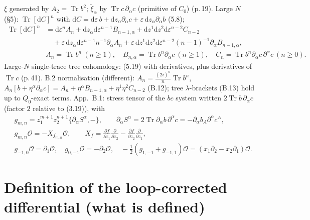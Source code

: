 \documentclass[11pt]{article}
\newcommand{\Tr}{\operatorname{Tr}}
\newcommand{\cO}{\mathcal{O}}
\begin{document}
$\xi$ generated by $A_2=\Tr b^2$; $\tilde\xi_\alpha$ by $\Tr c\,\partial_\alpha c$ (primitive of $C_0$) (p.\,19). Large $N$ (§5): $\Tr[\mathrm dC]^n$ with $\mathrm dC=\mathrm d\varepsilon\,b+\mathrm dz_\alpha\partial_\alpha c+\varepsilon\,\mathrm dz_\alpha\partial_\alpha b$ (5.8);
\begin{align}
\Tr[\mathrm dC]^n&=\mathrm d\varepsilon^nA_n+\mathrm dz_\alpha\mathrm d\varepsilon^{n-1}B_{n-1,\alpha}+\mathrm dz^1\mathrm dz^2\mathrm d\varepsilon^{n-2}C_{n-2}\nonumber\\
&\quad+\varepsilon\,\mathrm dz_\alpha\mathrm d\varepsilon^{n-1}n^{-1}\partial_\alpha A_n+\varepsilon\,\mathrm dz^1\mathrm dz^2\mathrm d\varepsilon^{n-2}(n-1)^{-1}\partial_\alpha B_{n-1,\alpha}, \tag{5.10}\\
&A_n=\Tr b^n\ (n\geq1),\quad B_{n,\alpha}=\Tr b^n\partial_\alpha c\ (n\geq1),\quad C_n=\Tr b^n\partial_\alpha c\,\partial^\alpha c\ (n\geq0). \tag{5.19}
\end{align}
Large-$N$ single-trace tree cohomology: (5.19) with derivatives, plus derivatives of $\Tr c$ (p.\,41). B.2 normalisation (different): $A_n=\frac{(2i)^n}{n}\Tr b^n$, $A_n[b+\eta^\alpha\partial_\alpha c]=A_n+\eta^\alpha B_{n-1,\alpha}+\eta^1\eta^2C_{n-2}$ (B.12); tree $\lambda$-brackets (B.13) hold up to $Q_0$-exact terms. App.~B.1: stress tensor of the $bc$ system written $2\Tr b\,\partial_\alpha c$ (factor $2$ relative to (3.19)), with
\begin{align}
&g_{m,n}=z_1^{m+1}z_2^{n+1}\{\partial_\alpha S^\alpha,-\},\qquad \partial_\alpha S^\alpha=2\Tr\partial_\alpha b\,\partial^\alpha c=-\partial_\alpha b_A\partial^\alpha c^A, \tag{B.8}\\
&g_{m,n}\cO=-X_{f_{m,n}}\cO,\qquad X_f=\frac{\partial f}{\partial z_1}\frac{\partial}{\partial z_2}-\frac{\partial f}{\partial z_2}\frac{\partial}{\partial z_1}, \tag{B.10, B.4}\\
&g_{-1,0}\cO=\partial_1\cO,\quad g_{0,-1}\cO=-\partial_2\cO,\quad -\tfrac12(g_{1,-1}+g_{-1,1})\cO=(x_1\partial_2-x_2\partial_1)\cO. \tag{B.11}
\end{align}

\section{Definition of the loop-corrected differential (what is defined)}
\end{document}
